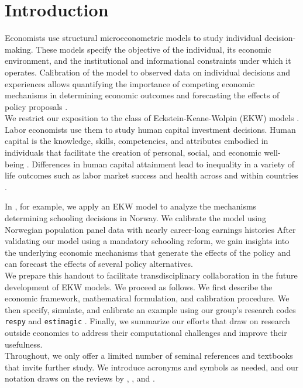 \section{Introduction}
\noindent Economists use structural microeconometric models to study individual decision-making. These models specify the objective of the individual, its economic environment, and the institutional and informational constraints under which it operates. Calibration of the model to observed data on individual decisions and experiences allows quantifying the importance of competing economic mechanisms in determining economic outcomes and forecasting the effects of policy proposals \citep{Wolpin.2013}.\\

\noindent We restrict our exposition to the class of Eckstein-Keane-Wolpin (EKW) models \citep{Adda.2017, Blundell.2016, Keane.1997}. Labor economists use them to study human capital investment decisions. Human capital is the knowledge, skills, competencies, and attributes embodied in individuals that facilitate the creation of personal, social, and economic well-being \citep{Becker.1964}. Differences in human capital attainment lead to inequality in a variety of life outcomes such as labor market success and health across and within countries \citep{OECD.2001}.

In \citet{Bhuller.2018}, for example, we apply an EKW model to analyze the mechanisms determining schooling decisions in Norway. We calibrate the model using Norwegian population panel data with nearly career-long earnings histories  After validating our model using a mandatory schooling reform, we gain insights into the underlying economic mechanisms that generate the effects of the policy and can forecast the effects of several policy alternatives.\\

\noindent We prepare this handout to facilitate transdisciplinary collaboration in the future development of EKW models. We proceed as follows. We first describe the economic framework, mathematical formulation, and calibration procedure. We then specify, simulate, and calibrate an example using our group's research codes \verb+respy+ \citep{respy-1.0} and \verb+estimagic+ \citep{Gabler.2019}. Finally, we summarize our efforts that draw on research outside economics to address their computational challenges and improve their usefulness.\\

\noindent Throughout, we only offer a limited number of seminal references and textbooks that invite further study. We introduce acronyms and symbols as needed, and our notation draws on the reviews by \cite{Aguirregabiria.2010}, \cite{Arcidiacono.2011}, and \cite{Puterman.1994}.
